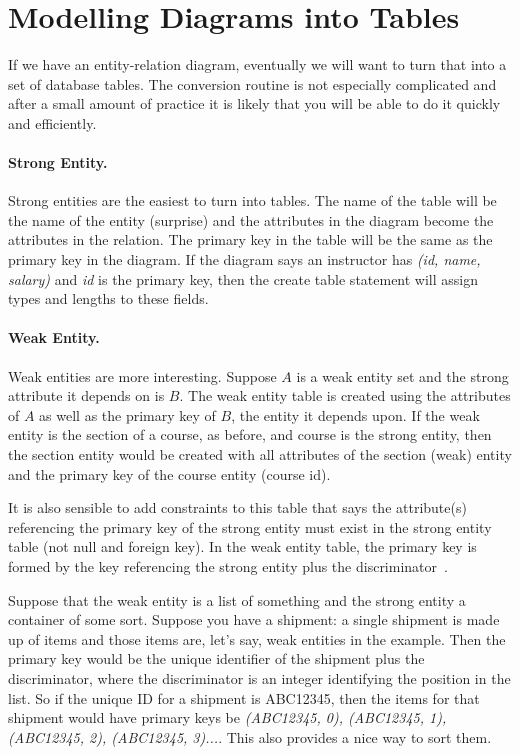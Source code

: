 




\section*{Modelling Diagrams into Tables}
If we have an entity-relation diagram, eventually we will want to turn that into a set of database tables. The conversion routine is not especially complicated and after a small amount of practice it is likely that you will be able to do it quickly and efficiently.

\paragraph{Strong Entity.} Strong entities are the easiest to turn into tables. The name of the table will be the name of the entity (surprise) and the attributes in the diagram become the attributes in the relation. The primary key in the table will be the same as the primary key in the diagram. If the diagram says an instructor has \textit{(id, name, salary)} and \textit{id} is the primary key, then the create table statement will assign types and lengths to these fields. 

\paragraph{Weak Entity.} Weak entities are more interesting. Suppose $A$ is a weak entity set and the strong attribute it depends on is $B$. The weak entity table is created using the attributes of $A$ as well as the primary key of $B$, the entity it depends upon. If the weak entity is the section of a course, as before, and course is the strong entity, then the section entity would be created with all attributes of the section (weak) entity and the primary key  of the course entity (course id).

It is also sensible to add constraints to this table that says the attribute(s) referencing the primary key of the strong entity  must exist in the strong entity table (not null and foreign key). In the weak entity table, the primary key is formed by the key referencing the strong entity plus the discriminator~\cite{dsc}.

Suppose that the weak entity is a list of something and the strong entity a container of some sort. Suppose you have a shipment: a single shipment is made up of items and those items are, let's say, weak entities in the example. Then the primary key would be the unique identifier of the shipment plus the discriminator, where the discriminator is an integer identifying the position in the list. So if the unique ID for a shipment is ABC12345, then the items for that shipment would have primary keys be \textit{(ABC12345, 0), (ABC12345, 1), (ABC12345, 2), (ABC12345, 3)...}. This also provides a nice way to sort them.

